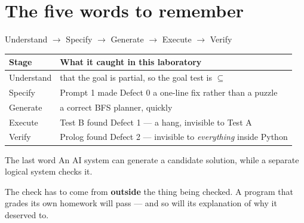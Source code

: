 \documentclass[11pt,a4paper]{article}
\begin{document}
\section{The five words to remember}

\begin{center}
\Large
Understand $\rightarrow$ Specify $\rightarrow$ Generate $\rightarrow$ Execute $\rightarrow$ Verify
\end{center}

\vspace{4pt}

\begin{center}
\small
\begin{tabular}{@{}ll@{}}
\toprule
\textbf{Stage} & \textbf{What it caught in this laboratory} \\
\midrule
Understand & that the goal is partial, so the goal test is $\subseteq$ \\
Specify    & Prompt 1 made Defect 0 a one-line fix rather than a puzzle \\
Generate   & a correct BFS planner, quickly \\
Execute    & Test B found Defect 1 --- a hang, invisible to Test A \\
Verify     & Prolog found Defect 2 --- invisible to \emph{everything} inside Python \\
\bottomrule
\end{tabular}
\end{center}

\vspace{8pt}

\begin{keyidea}{The last word}
An AI system can generate a candidate solution, while a separate logical system
checks it.

The check has to come from \textbf{outside} the thing being checked. A program
that grades its own homework will pass --- and so will its explanation of why it
deserved to.
\end{keyidea}
\end{document}
